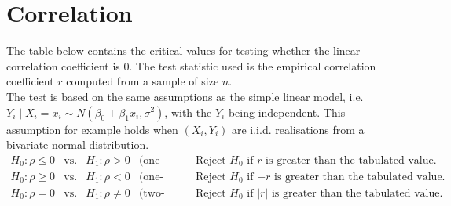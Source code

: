 \section{Correlation}
\noindent The table below contains the critical values for testing whether the linear correlation coefficient is $0$. The test statistic used is the empirical correlation coefficient $r$ computed from a sample of size $n$.\\[5pt]
\noindent The test is based on the same assumptions as the simple linear model, i.e. $Y_i\mid X_i=x_i\sim N(\beta_0+\beta_1x_i,\sigma^2)$, with the $Y_i$ being independent. This assumption for example holds when $(X_i,Y_i)$ are i.i.d. realisations from a bivariate normal distribution.
\[
\begin{array}{rclll}
	H_0:\rho\le0 & \text{vs.} & H_1:\rho>0
	& \text{(one-sided):} & \text{Reject $H_0$ if $r$ is greater than the tabulated value.}\\
	H_0:\rho\ge0 & \text{vs.} & H_1:\rho<0
	& \text{(one-sided):} & \text{Reject $H_0$ if $-r$ is greater than the tabulated value.}\\
	H_0:\rho=0 & \text{vs.} & H_1:\rho\ne0
	& \text{(two-sided):} & \text{Reject $H_0$ if $|r|$ is greater than the tabulated value.}
\end{array}
\]


